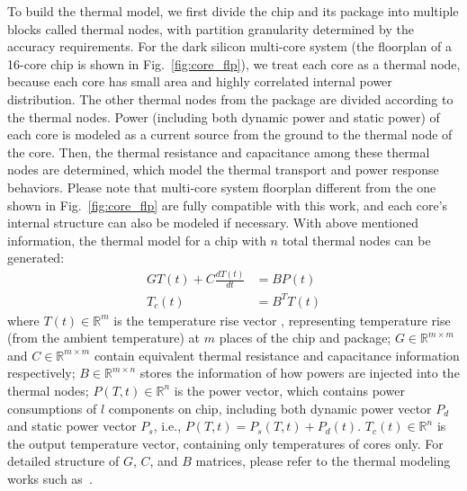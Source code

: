 To build the thermal model, we first divide the chip and its package
into multiple blocks called thermal nodes, with partition granularity
determined by the accuracy requirements. For the dark silicon
multi-core system (the floorplan of a 16-core chip is shown in
Fig.~\ref{fig:core_flp}), we treat each core as a thermal node,
because each core has small area and highly correlated internal power
distribution. The other thermal nodes from the package are divided
according to the thermal nodes. Power (including both dynamic power
and static power) of each core is modeled as a current source from the
ground to the thermal node of the core. Then, the thermal resistance and capacitance among these thermal nodes are determined, which model the thermal transport and power response behaviors. Please note that multi-core system floorplan different from the one shown in Fig.~\ref{fig:core_flp} are fully compatible with this work, and each core's internal structure can also be modeled if necessary. With above mentioned information, the thermal model for a chip with $n$ total thermal nodes can be generated:
\begin{equation}\label{eq:therm_model}
\begin{split}
GT(t) + C\frac{dT(t)}{dt} &= BP(t)\\
T_{c}(t) &= B^{T}T(t)
\end{split}
\end{equation}
where $T(t) \in \mathbb{R}^m$ is the temperature rise vector , representing temperature rise (from the ambient temperature) at $m$ places of the chip and package; $G \in \mathbb{R}^{m\times m}$ and  $C \in \mathbb{R}^{m \times m}$ contain equivalent thermal resistance and capacitance information respectively; $B \in \mathbb{R}^{m \times n}$ stores the information of how powers are injected into the thermal nodes; $P(T, t) \in \mathbb{R}^{n}$ is the power vector, which contains power consumptions of $l$ components on chip, including both dynamic power vector $P_d$ and static power vector $P_s$, i.e., $P(T, t)=P_s(T, t)+P_d(t)$. $T_{c}(t) \in \mathbb{R}^n$ is the output temperature vector, containing only temperatures of cores only. For detailed structure of $G$, $C$, and $B$ matrices, please refer to the thermal modeling works such as~\cite{Huang:TVLSI'06,Huang:TC'08,WangTan:TODAES'13,Hanumaiah:TCAD'11}.